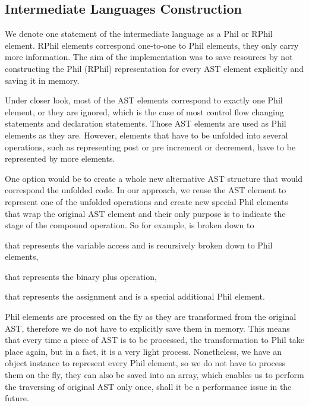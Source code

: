     \subsection{Intermediate Languages Construction}
        We denote one statement of the intermediate language as
        a Phil or RPhil element. RPhil elements correspond 
        one-to-one to Phil elements, they only carry more 
        information. The aim of the implementation was to 
        save resources by not constructing the Phil (RPhil) 
        representation for every AST element explicitly and 
        saving it in memory.
        
        Under closer look, most of the AST elements correspond to 
        exactly one Phil element, or they are ignored, 
        which is the case of most control flow changing statements 
        and declaration statements. Those AST elements are used as 
        Phil elements as they are. However, elements that have to be 
        unfolded into several operations, such as  
        representing post or pre increment or decrement, have to 
        be represented by more elements. 
        
        One option would be to create a whole new alternative 
        AST structure that would correspond the unfolded code. 
        In our approach, we reuse the AST element to represent one 
        of the unfolded operations and create new special Phil 
        elements that wrap the original AST element and their 
        only purpose is to indicate the stage of the compound 
        operation. So for example,  is broken down 
        to 
        \begin{itemize*}
            \item {} that represents the variable access and 
                is recursively broken down to Phil elements, 
            \item {} that represents the binary plus operation,
            \item {} that represents the assignment 
                and is a special additional Phil element.
        \end{itemize*}
        
        Phil elements are processed on the fly as they are transformed from 
        the original AST, therefore we do not have to explicitly save them 
        in memory. This means that every time a piece of AST is to be processed, 
        the transformation to Phil take place again, but in a fact, it is 
        a very light process. Nonetheless, we have an object instance to 
        represent every Phil element, so we do not have to process them 
        on the fly, they can also be saved into an array, which enables 
        us to perform the traversing of original AST only once, shall 
        it be a performance issue in the future.
        
